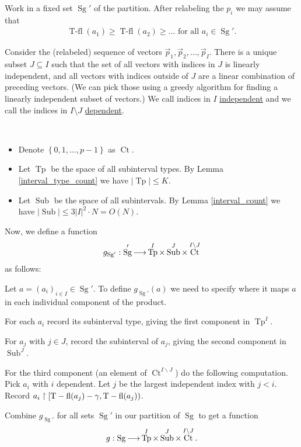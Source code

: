 \documentclass{amsart}
\newcommand{\curly}[1]{\left\{#1\right\}}
\DeclareMathOperator{\Sg}{Sg}
\DeclareMathOperator{\It}{Tp}
\DeclareMathOperator{\Sub}{Sub}
\DeclareMathOperator{\Ct}{Ct}
\DeclareMathOperator{\tfl}{T-fl}
\newcommand{\defn}{\ul}
\begin{document}
Work in a fixed set $\Sg'$ of the partition.
After relabeling the $p_i$ we may assume that
\begin{align*}
  \tfl(a_1) \geq \tfl(a_2) \geq \ldots \text { for all $a_i \in \Sg'$}.
\end{align*}

Consider the (relabeled) sequence of vectors $\vec p_1, \vec p_2, \ldots, \vec p_I$.
There is a unique subset $J \subseteq I$ such that the set of all vectors with indices in $J$ is linearly independent,
and all vectors with indices outside of $J$ are a linear combination of preceding vectors.
(We can pick those using a greedy algorithm for finding a linearly independent subset of vectors.)
We call indices in $I$ \defn{independent} and we call the indices in $I \setminus J$ \defn{dependent}.


\begin{Definition} \ 
  \begin{itemize}
  \item Denote $\curly{0,1, \ldots, p-1}$ as \defn{$\Ct$}.
  \item Let \defn{$\It$} be the space of all subinterval types.
    By Lemma \ref{interval_type_count} we have $|\It| \leq K$.
  \item Let \defn{$\Sub$} be the space of all subintervals.
    By Lemma \ref{interval_count} we have $|\Sub| \leq 3 |I|^2 \cdot N = O(N)$.
  \end{itemize}
\end{Definition}

\begin{Definition}
  Now, we define a function
  \begin{align*}
    g_{\Sg'}: \Sg' \arr \It^I \times \Sub^J \times \Ct^{I \backslash J}
  \end{align*}
  as follows:
  
  Let $a = (a_i)_{i\in I} \in \Sg'$.
  To define $g_{\Sg'}(a)$ we need to specify where it maps $a$ in each individual component of the product.

  For each $a_i$ record its subinterval type, giving the first component in $\It^I$.

  For $a_j$ with $j \in J$, record the subinterval of $a_j$, giving the second component in $\Sub^J$.

  For the third component (an element of $\Ct^{I \backslash J}$) do the following computation.
  Pick $a_i$ with $i$ dependent.
  Let $j$ be the largest independent index with $j < i$.
  Record $a_i \midr [\tfl(a_j) - \gamma, \tfl(a_j))$.

  Combine $g_{\Sg'}$ for all sets $\Sg'$ in our partition of $\Sg$ to get a function 
  \begin{align*}
    g: \Sg \arr \It^I \times \Sub^J \times \Ct^{I \backslash J}.  
  \end{align*}
\end{Definition}
\end{document}
